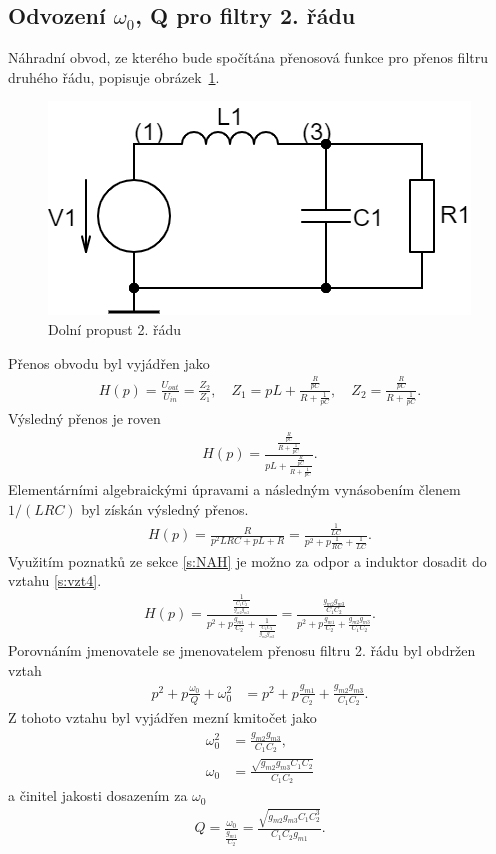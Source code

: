 \subsection{Odvození $\omega_0$, Q pro filtry 2. řádu}\label{s:ODV}
\noindent Náhradní obvod, ze kterého bude spočítána přenosová funkce pro přenos filtru druhého řádu, popisuje obrázek~\ref{s:DPO}.
\begin{figure}[h]
\centering
\includegraphics[scale=0.3]{circuit(1).png}
\caption{Dolní propust 2. řádu \label{s:DPO}} 
\end{figure}
\noindent Přenos obvodu byl vyjádřen jako
\begin{align}
H(p) = \frac{U_{out}}{U_{in}} = \frac{Z_2}{Z_1}, \quad Z_1 = pL + \frac{\frac{R}{pC}}{R + \frac{1}{pC}},\quad Z_2 = \frac{\frac{R}{pC}}{R + \frac{1}{pC}}.
\end{align}
Výsledný přenos je roven 
\begin{align}
H(p) = \frac{\frac{\frac{R}{pC}}{R + \frac{1}{pC}}}{pL + \frac{\frac{R}{pC}}{R + \frac{1}{pC}}}.
\end{align}
Elementárními algebraickými úpravami a následným vynásobením členem $1/(LRC)$ byl získán výsledný přenos.
\begin{align}\label{s:vzt4}
H(p) = \frac{R}{p^2LRC + pL + R} = \frac{\frac{1}{LC}}{p^2 + p\frac{1}{RC} + \frac{1}{LC}}.
\end{align}
\noindent Využitím poznatků ze sekce \ref{s:NAH} je možno za odpor a induktor dosadit do vztahu \ref{s:vzt4}.
\begin{align}
H(p) = \frac{\frac{1}{\frac{C_1C_2}{g_{m2}g_{m3}}}}{p^2 + p\frac{g_{m1}}{C_2} + \frac{1}{\frac{C_1C_2}{g_{m2}g_{m3}}}} = \frac{\frac{g_{m2}g_{m3}}{C_1C_2}}{p^2 + p\frac{g_{m1}}{C_2} + \frac{g_{m2}g_{m3}}{C_1C_2}}.
\end{align}
Porovnáním jmenovatele se jmenovatelem přenosu filtru 2. řádu byl obdržen vztah
\begin{align}
p^2 + p\frac{\omega _0}{Q} + \omega _0^2 &= p^2 + p\frac{g_{m1}}{C_2} + \frac{g_{m2}g_{m3}}{C_1C_2}.
\end{align}
Z tohoto vztahu byl vyjádřen mezní kmitočet jako 
\begin{align}
\omega _0^2 &= \frac{g_{m2}g_{m3}}{C_1C_2}, \\
\omega _0 &= \frac{\sqrt{g_{m2}g_{m3}C_1C_2}}{C_1C_2}
\end{align}
a činitel jakosti dosazením za $\omega _0$
\begin{align}
Q = \frac{\omega _0}{\frac{g_{m1}}{C_2}} = \frac{\sqrt{g_{m2}g_{m3}C_1C_2^3}}{C_1C_2g_{m1}}.
\end{align}

